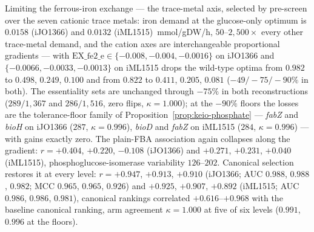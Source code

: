 \begin{proposition}
\label{prop:keio-iron}
Limiting the ferrous-iron exchange --- the trace-metal axis,
selected by pre-screen over the seven cationic trace metals: iron
demand at the glucose-only optimum is $0.0158$ (iJO1366) and
$0.0132$ (iML1515)~mmol/gDW/h, $50$--$2{,}500\times$ every other
trace-metal demand, and the cation axes are interchangeable
proportional gradients --- with
$\mathrm{EX\_fe2\_e}\in\{-0.008,-0.004,-0.0016\}$ on iJO1366 and
$\{-0.0066,-0.0033,-0.0013\}$ on iML1515 drops the wild-type
optima from $0.982$ to $0.498$, $0.249$, $0.100$ and from $0.822$
to $0.411$, $0.205$, $0.081$ ($-49/-75/-90\%$ in both). The
essentiality sets are unchanged through $-75\%$ in both
reconstructions ($289/1{,}367$ and $286/1{,}516$, zero flips,
$\kappa=1.000$); at the $-90\%$ floors the losses are the
tolerance-floor family of
Proposition~\ref{prop:keio-phosphate} --- \emph{fabZ} and
\emph{bioH} on iJO1366 ($287$, $\kappa=0.996$), \emph{bioD} and
\emph{fabZ} on iML1515 ($284$, $\kappa=0.996$) --- with gains
exactly zero. The plain-FBA association again collapses along the
gradient: $r=+0.404$, $+0.220$, $-0.108$ (iJO1366) and $+0.271$,
$+0.231$, $+0.040$ (iML1515), phosphoglucose-isomerase variability
$126$--$202$. Canonical selection restores it at every level:
$r=+0.947$, $+0.913$, $+0.910$ (iJO1366; AUC $0.988$, $0.988$,
$0.982$; MCC $0.965$, $0.965$, $0.926$) and $+0.925$, $+0.907$,
$+0.892$ (iML1515; AUC $0.986$, $0.986$, $0.981$), canonical
rankings correlated $+0.616$--$+0.968$ with the baseline canonical
ranking, arm agreement $\kappa=1.000$ at five of six levels
($0.991$, $0.996$ at the floors).
\end{proposition}


